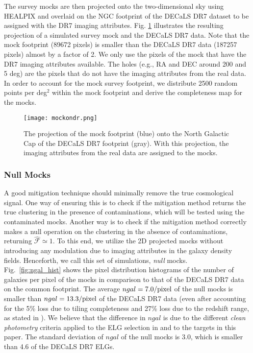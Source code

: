 \documentclass[fleqn, usenatbib]{mnras}
\begin{document}
The survey mocks are then projected onto the two-dimensional sky using HEALPIX and overlaid on the NGC footprint of the DECaLS DR7 dataset to be assigned with the DR7 imaging attributes. Fig. \ref{fig:mock_on_dr} illustrates the resulting projection of a simulated survey mock and the DECaLS DR7 data. Note that the mock footprint (89672 pixels) is smaller than the DECaLS DR7 data (187257 pixels) almost by a factor of 2. We only use the pixels of the mock that have the DR7 imaging attributes available. The holes (e.g., RA and DEC around 200 and 5 deg) are the pixels that do not have the imaging attributes from the real data. In order to account for the mock survey footprint, we distribute 2500 random points per deg$^{2}$ within the mock footprint and derive the completeness map for the mocks.


\begin{figure}
    \centering
    \texttt{[image: mockondr.png]}
    \caption{The projection of the mock footprint (blue) onto the North Galactic Cap of the DECaLS DR7 footprint (gray). With this projection, the imaging attributes from the real data are assigned to the mocks.}
    \label{fig:mock_on_dr}
\end{figure}


\subsubsection{Null Mocks}
A good mitigation technique should minimally remove the true cosmological signal. One way of ensuring this is to check if the mitigation method returns the true clustering in the presence of contaminations, which will be tested using the contaminated mocks. Another way is to check if the mitigation method correctly makes a null operation on the clustering in the absence of contaminations, returning $\hat{\mathcal{F}}\simeq 1$. To this end, we utilize the 2D projected mocks without introducing any modulation due to imaging attributes in the galaxy density fields. Henceforth, we call this set of simulations, \textit{null} mocks.\\

Fig.~\ref{fig:ngal_hist} shows the pixel distribution histograms of the number of galaxies per pixel of the mocks in comparison to that of the DECaLS DR7 data on the common footprint. The average $ngal=7.0/{\rm pixel}$ of the null mocks is smaller than $ngal=13.3/{\rm pixel}$ of the DECaLS DR7 data (even after accounting for the 5\% loss due to tiling completeness and 27\% loss due to the redshift range, as stated in \citet{Raichoor2017MNRAS.471.3955R}). We believe that the difference in $ngal$ is due to the different \textit{clean photometry} criteria applied to the ELG selection in \citet{Raichoor2017MNRAS.471.3955R} and to the targets in this paper. The standard deviation of $ngal$ of the null mocks is 3.0, which is smaller than 4.6 of the DECaLS DR7 ELGs.
\end{document}
